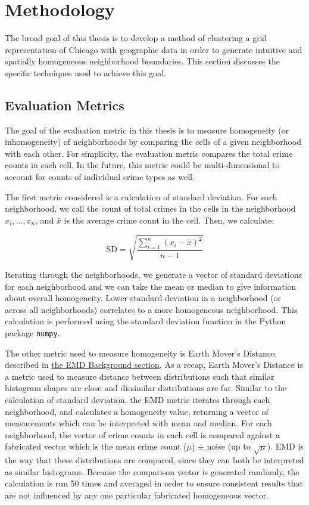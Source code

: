 \documentclass[times new roman,12pt]{article}
\begin{document}
\newpage


\section{Methodology}

The broad goal of this thesis is to develop a method of clustering a grid representation of Chicago with geographic data in order to generate intuitive and spatially homogeneous neighborhood boundaries. This section discusses the specific techniques used to achieve this goal. 

\subsection{Evaluation Metrics}
\label{eval}

The goal of the evaluation metric in this thesis is to measure homogeneity (or inhomogeneity) of neighborhoods by comparing the cells of a given neighborhood with each other. For simplicity, the evaluation metric compares the total crime counts in each cell. In the future, this metric could be multi-dimensional to account for counts of individual crime types as well.

The first metric considered is a calculation of standard deviation. For each neighborhood, we call the count of total crimes in the cells in the neighborhood $x_i,...,x_n$, and $\bar{x}$ is the average crime count in the cell. Then, we calculate:

$$\text{SD}=\sqrt{\frac{\sum_{i=1}^{n}{(x_i-\bar{x})}^2}{n-1}}$$
\vspace{3mm}

Iterating through the neighborhoods, we generate a vector of standard deviations for each neighborhood and we can take the mean or median to give information about overall homogeneity. Lower standard deviation in a neighborhood (or across all neighborhoods) correlates to a more homogeneous neighborhood. This calculation is performed using the standard deviation function in the Python package \texttt{numpy}. 

The other metric used to measure homogeneity is Earth Mover's Distance, described in \hyperref[emd]{the EMD Background section}. As a recap, Earth Mover's Distance is a metric used to measure distance between distributions such that similar histogram shapes are close and dissimilar distributions are far. Similar to the calculation of standard deviation, the EMD metric iterates through each neighborhood, and calculates a homogeneity value, returning a vector of measurements which can be interpreted with mean and median. For each neighborhood, the vector of crime counts in each cell is compared against a fabricated vector which is the mean crime count ($\mu$) $\pm$ noise (up to $\sqrt{\mu}$). EMD is the way that these distributions are compared, since they can both be interpreted as similar histograms. Because the comparison vector is generated randomly, the calculation is run 50 times and averaged in order to ensure consistent results that are not influenced by any one particular fabricated homogeneous vector. 
\end{document}
